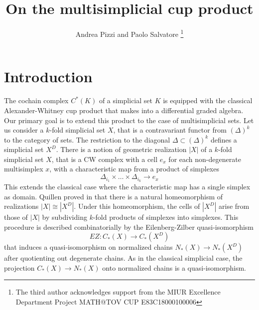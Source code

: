 \documentclass[a4paper,11pt]{article}
\theoremstyle{remark}
\theoremstyle{definition}
\begin{document}
\title{On the multisimplicial cup product}
\date{}
\author{Andrea Pizzi and Paolo Salvatore  \footnote{The third author acknowledges support from 
the MIUR Excellence Department Project MATH@TOV CUP E83C18000100006}
 }

	
\maketitle



	
\section{Introduction}

The cochain complex $C^*(K)$ of a simplicial set $K$ is equipped with the classical Alexander-Whitney cup product that makes into a
differential graded algebra.
Our primary goal is to extend this product to the case of multisimplicial sets.  Let us consider a $k$-fold simplicial set $X$, that is a contravariant functor from $(\Delta)^k$ to the category of sets. The restriction to the diagonal  $\Delta \subset (\Delta)^k$ defines a simplicial set $X^D$. There is a notion 
of geometric realization $|X|$ of a $k$-fold simplicial set $X$, that is a CW complex with a cell $e_x$ for each non-degenerate multisimplex $x$, with a characteristic map from a product of simplexes  $$\Delta_{i_1} \times \dots \times \Delta_{i_k} \to e_x$$ This extends the classical case where the characteristic map has a single simplex as domain. 
Quillen proved in 
\cite{Quillen} that there is  a natural homeomorphism of realizations $|X| \cong |X^D|$. Under this homeomorphism, the cells of $|X^D|$ arise from those
of $|X|$ by subdividing $k$-fold products of simplexes into simplexes. This procedure is described combinatorially by the Eilenberg-Zilber quasi-isomorphism $$EZ:C_*(X) \to C_*(X^D)$$ that induces a quasi-isomorphism on normalized chains 
$N_*(X) \to N_*(X^D)$ after quotienting out degenerate chains.
 As in the classical simplicial case, the projection $C_*(X) \to N_*(X)$ onto normalized chains 
is a quasi-isomorphism.

\medskip
\end{document}
